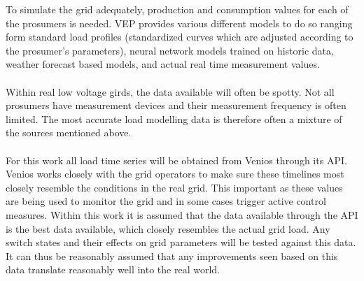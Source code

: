To simulate the grid adequately, production and consumption values for
each of the prosumers is needed. VEP provides various different models
to do so ranging form standard load profiles (standardized curves which are adjusted
according to the prosumer's parameters), neural network models trained on historic data,
weather forecast based models, and actual real time measurement values\autocite{venios}.\\
\\
Within real low voltage girds, the data available will often be spotty. Not all prosumers
have measurement devices and their measurement frequency is often limited. The most accurate
load modelling data is therefore often a mixture of the sources mentioned above.\\
\\ 
For this work all load time series will be obtained from Venios through its API. Venios works
closely with the grid operators to make sure these timelines most closely resemble the conditions
in the real grid. This important as these values are being used to monitor the grid and in some
cases trigger active control measures\autocite{venios}. Within this work it is assumed that the data
available through the API is the best data available, which closely resembles the actual grid load.
Any switch states and their effects on grid parameters will be tested against this data. It can
thus be reasonably assumed that any improvements seen based on this data translate reasonably well
into the real world. 

